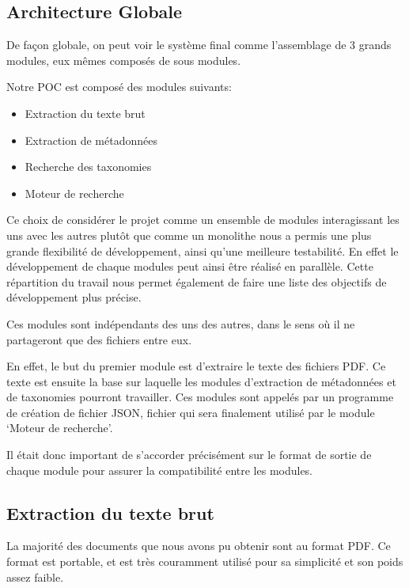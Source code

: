 

\subsection{Architecture Globale}
De façon globale, on peut voir le système final comme l'assemblage de 3 grands modules, eux mêmes composés de sous modules. 

Notre POC est composé des modules suivants:
\begin{itemize}
	\item Extraction du texte brut
	\item Extraction de métadonnées
	\item Recherche des taxonomies
	\item Moteur de recherche
\end{itemize}

Ce choix de considérer le projet comme un ensemble de modules interagissant les uns avec les autres plutôt que comme un monolithe nous a permis une plus grande flexibilité de développement, ainsi qu'une meilleure testabilité.
En effet le développement de chaque modules peut ainsi être réalisé en parallèle.
Cette répartition du travail nous permet également de faire une liste des objectifs de développement plus précise. 

Ces modules sont indépendants des uns des autres, dans le sens où il ne partageront que des fichiers entre eux.

En effet, le but du premier module est d'extraire le texte des fichiers PDF\@.
Ce texte est ensuite la base sur laquelle les modules d'extraction de métadonnées et de taxonomies pourront travailler.
Ces modules sont appelés par un programme de création de fichier \gls{JSON}, fichier qui sera finalement utilisé par le module `Moteur de recherche'. 

Il était donc important de s'accorder précisément sur le format de sortie de chaque module pour assurer la compatibilité entre les modules.

\subsection{Extraction du texte brut}
La majorité des documents que nous avons pu obtenir sont au format PDF\@.
Ce format est portable, et est très couramment utilisé pour sa simplicité et son poids assez faible.

